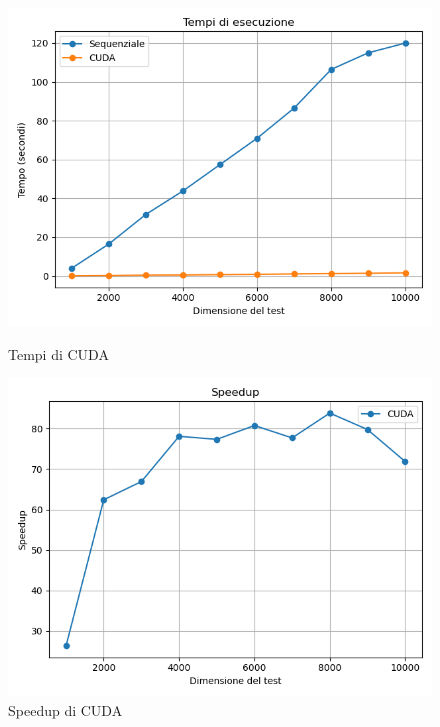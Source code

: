 \documentclass[11pt]{article}
\begin{document}
    \begin{figure}[H]
        \centering
        \begin{minipage}{0.49\textwidth}
            \centering
            \includegraphics[width=\textwidth]{plots/cuda_times}
            \caption{Tempi di CUDA}\label{fig:times-cuda}
        \end{minipage}
        \begin{minipage}{0.49\textwidth}
            \centering
            \includegraphics[width=\textwidth]{plots/cuda_speedup}
            \caption{Speedup di CUDA}\label{fig:speedup-cuda}
        \end{minipage}
    \end{figure}
\end{document}
